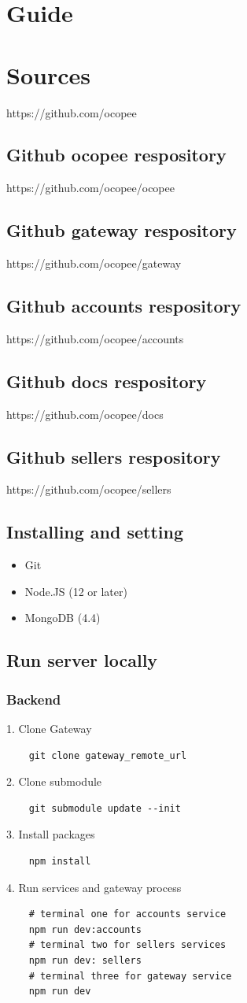 \documentclass{report}
\begin{document}
\section{Guide}
\section{Sources}
https://github.com/ocopee

\subsection{Github ocopee respository}
https://github.com/ocopee/ocopee
\subsection{Github gateway respository}
https://github.com/ocopee/gateway
\subsection{Github accounts respository}
https://github.com/ocopee/accounts
\subsection{Github docs respository}
https://github.com/ocopee/docs
\subsection{Github sellers respository}
https://github.com/ocopee/sellers
\subsection{Installing and setting}
\begin{itemize}
	\item Git
	\item Node.JS (12 or later)
	\item MongoDB (4.4)
\end{itemize}
\subsection{Run server locally}
\subsubsection{Backend}
1. Clone Gateway
\begin{lstlisting}
	git clone gateway_remote_url
\end{lstlisting}
2. Clone submodule
\begin{lstlisting}
	git submodule update --init
\end{lstlisting}
3. Install packages
\begin{lstlisting}
	npm install
\end{lstlisting}
4. Run services and gateway process
\begin{lstlisting}
	# terminal one for accounts service
	npm run dev:accounts
	# terminal two for sellers services
	npm run dev: sellers
	# terminal three for gateway service
	npm run dev
\end{lstlisting}
\end{document}
